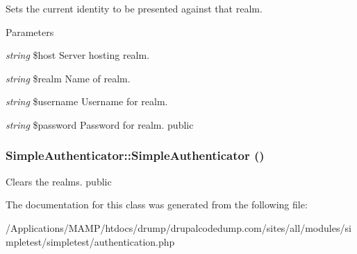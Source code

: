 \label{class_simple_authenticator_a557e4ed50c3623b0fc777dbf6723d5d3}
Sets the current identity to be presented against that realm. 
\begin{DoxyParams}{Parameters}
\item[{\em string}]\$host Server hosting realm. \item[{\em string}]\$realm Name of realm. \item[{\em string}]\$username Username for realm. \item[{\em string}]\$password Password for realm.  public \end{DoxyParams}
\hypertarget{class_simple_authenticator_a19587b9af0878aaa151a8f08da17e758}{
\subsubsection[{SimpleAuthenticator}]{\setlength{\rightskip}{0pt plus 5cm}SimpleAuthenticator::SimpleAuthenticator ()}}
\label{class_simple_authenticator_a19587b9af0878aaa151a8f08da17e758}
Clears the realms.  public 

The documentation for this class was generated from the following file:\begin{DoxyCompactItemize}
\item 
/Applications/MAMP/htdocs/drump/drupalcodedump.com/sites/all/modules/simpletest/simpletest/authentication.php\end{DoxyCompactItemize}
